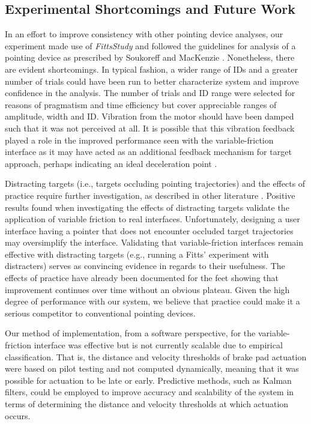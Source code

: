 \documentclass [12pt,letterpaper]{report}
\begin{document}
\subsection{Experimental Shortcomings and Future Work}

In an effort to improve consistency with other pointing device analyses, our experiment made use of \textit{FittsStudy} and followed the guidelines for analysis of a pointing device as prescribed by Soukoreff and MacKenzie \cite{soukoreff2004towards}. Nonetheless, there are evident shortcomings.  In typical fashion, a wider range of IDs and a greater number of trials could have been run to better characterize system and improve confidence in the analysis. The number of trials and ID range were selected for reasons of pragmatism and time efficiency but cover appreciable ranges of amplitude, width and ID. Vibration from the motor should have been damped such that it was not perceived at all. It is possible that this vibration feedback played a role in the improved performance seen with the variable-friction interface as it may have acted as an additional feedback mechanism for target approach, perhaps indicating an ideal deceleration point \cite{akamatsu1995comparison}.

Distracting targets (i.e., targets occluding pointing trajectories) and the effects of practice require further investigation, as described in other literature \cite{levesque2011enhancing,velloso2015feet}. Positive results found when investigating the effects of distracting targets validate the application of variable friction to real interfaces. Unfortunately, designing a user interface having a pointer that does not encounter occluded target trajectories may oversimplify the interface. Validating that variable-friction interfaces remain effective with distracting targets (e.g., running a Fitts' experiment with distracters) serves as convincing evidence in regards to their usefulness.  The effects of practice have already been documented for the feet showing that improvement continues over time without an obvious plateau. Given the high degree of performance with our system, we believe that practice could make it a serious competitor to conventional pointing devices.

Our method of implementation, from a software perspective, for the variable-friction interface was effective but is not currently scalable due to empirical classification. That is, the distance and velocity thresholds of brake pad actuation were based on pilot testing and not computed dynamically, meaning that it was possible for actuation to be late or early. Predictive methods, such as Kalman filters, could be employed to improve accuracy and scalability of the system in terms of determining the distance and velocity thresholds at which actuation occurs.
\end{document}
